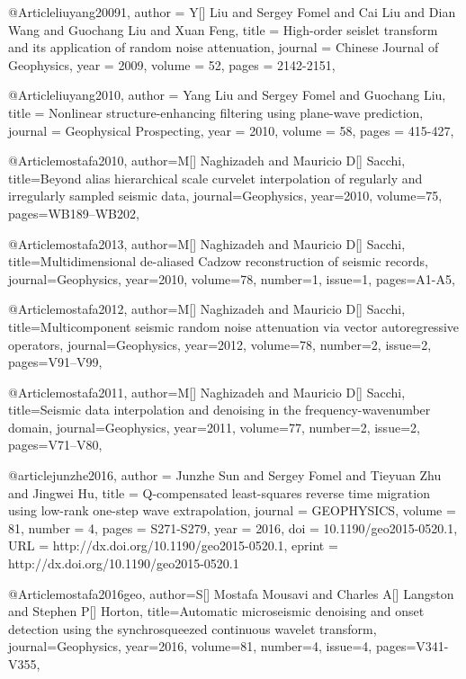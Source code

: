 @Article{liuyang20091,
  author = 	 {Y[] Liu and Sergey Fomel and Cai Liu and Dian Wang and Guochang Liu and Xuan Feng},
  title = 	 {High-order seislet transform and its application of random noise attenuation},
  journal = 	 {Chinese Journal of Geophysics},
  year = 	 2009,
  volume =	 52,
  pages =	 {2142-2151},
}

@Article{liuyang2010,
  author = 	 {Yang Liu and Sergey Fomel and Guochang Liu},
  title = 	 {Nonlinear structure-enhancing filtering using plane-wave prediction},
  journal = 	 {Geophysical Prospecting},
  year = 	 2010,
  volume =	 58,
  pages =	 {415-427},
}

@Article{mostafa2010,
  author={M[] Naghizadeh and Mauricio D[] Sacchi},
  title={Beyond alias hierarchical scale curvelet interpolation of regularly and irregularly sampled seismic data},
  journal={Geophysics},
  year=2010,
  volume=75,
  pages={WB189–WB202},
}

@Article{mostafa2013,
  author={M[] Naghizadeh and Mauricio D[] Sacchi},
  title={Multidimensional de-aliased Cadzow reconstruction of seismic records},
  journal={Geophysics},
  year=2010,
  volume=78,
  number=1,
  issue=1,
  pages={A1-A5},
}



@Article{mostafa2012,
  author={M[] Naghizadeh and Mauricio D[] Sacchi},
  title={Multicomponent seismic random noise attenuation via vector autoregressive operators},
  journal={Geophysics},
  year=2012,
  volume=78,
  number=2,
  issue=2,
  pages={V91–V99},
}

@Article{mostafa2011,
  author={M[] Naghizadeh and Mauricio D[] Sacchi},
  title={Seismic data interpolation and denoising in the frequency-wavenumber domain},
  journal={Geophysics},
  year=2011,
  volume=77,
  number=2,
  issue=2,
  pages={V71–V80},
}




@article{junzhe2016,
author = {Junzhe Sun and Sergey Fomel and Tieyuan Zhu and Jingwei Hu},
title = {Q-compensated least-squares reverse time migration using low-rank one-step wave extrapolation},
journal = {GEOPHYSICS},
volume = {81},
number = {4},
pages = {S271-S279},
year = {2016},
doi = {10.1190/geo2015-0520.1},
URL = {http://dx.doi.org/10.1190/geo2015-0520.1},
eprint = {http://dx.doi.org/10.1190/geo2015-0520.1}
}

@Article{mostafa2016geo,
  author={S[] Mostafa Mousavi and Charles A[] Langston and Stephen P[] Horton},
  title={Automatic microseismic denoising and onset detection using the synchrosqueezed continuous wavelet transform},
  journal={Geophysics},
  year=2016,
  volume=81,
  number=4,
  issue=4,
  pages={V341-V355},
}

